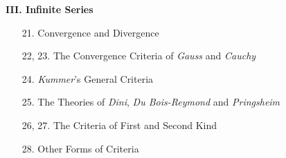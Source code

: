 {\begin{center}
    \textbf{\small{III. Infinite Series}}
\end{center}
\begin{enumerate}[itemsep=-1pt]
    \item[21.] Convergence and Divergence
    \item[22, 23.] The Convergence Criteria of \textit{Gauss} and \textit{Cauchy}
    \item[24.] \textit{Kummer}'s General Criteria
    \item[25.] The Theories of \textit{Dini}, \textit{Du Bois-Reymond} and \textit{Pringsheim}
    \item[26, 27.] The Criteria of First and Second Kind
    \item[28.] Other Forms of Criteria
\end{enumerate}
}

